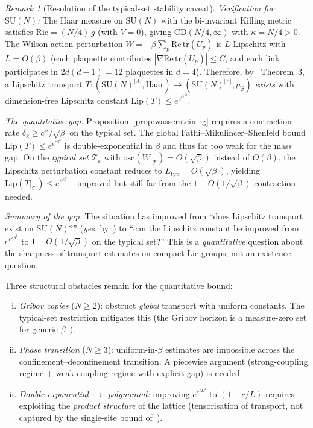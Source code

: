 \documentclass[12pt,a4paper]{article}
\theoremstyle{definition}
\theoremstyle{plain}
\theoremstyle{remark}
\newtheorem{remark}[definition]{Remark}
\begin{document}
\begin{remark}[Resolution of the typical-set stability caveat]
\emph{Verification for $\mathrm{SU}(N)$:}
The Haar measure on $\mathrm{SU}(N)$ with the bi-invariant Killing metric
satisfies $\mathrm{Ric} = (N/4)\,g$ (with $V = 0$),
giving $\mathrm{CD}(N/4, \infty)$ with $\kappa = N/4 > 0$.
The Wilson action perturbation $W = -\beta\sum_p \mathrm{Re}\,\mathrm{tr}(U_p)$
is $L$-Lipschitz with $L = O(\beta)$ (each plaquette contributes
$|\nabla \mathrm{Re}\,\mathrm{tr}(U_p)| \leq C$, and each link
participates in $2d(d-1) = 12$ plaquettes in $d=4$).
Therefore, by~\cite{FathiMikulincerShenfeld2024} Theorem~3,
a Lipschitz transport $T: (\mathrm{SU}(N)^{|\Lambda|}, \text{Haar})
\to (\mathrm{SU}(N)^{|\Lambda|}, \mu_\beta)$ \emph{exists} with
dimension-free Lipschitz constant $\mathrm{Lip}(T) \leq e^{e^{c\beta^2}}$.

\emph{The quantitative gap.}
Proposition~\ref{prop:wasserstein-rg} requires a contraction rate
$\delta_k \geq c''/\sqrt{\beta}$ on the typical set.  The global
Fathi--Mikulincer--Shenfeld bound $\mathrm{Lip}(T) \leq e^{e^{c\beta^2}}$
is double-exponential in $\beta$ and thus far too weak for the mass gap.
On the \emph{typical set} $\mathcal{T}_\varepsilon$ with
$\mathrm{osc}(W|_{\mathcal{T}}) = O(\sqrt{\beta})$ instead of $O(\beta)$,
the Lipschitz perturbation constant reduces to $L_{\mathrm{typ}} = O(\sqrt{\beta})$,
yielding $\mathrm{Lip}(T|_{\mathcal{T}}) \leq e^{e^{c\beta}}$ -- improved
but still far from the $1 - O(1/\sqrt{\beta})$ contraction needed.

\emph{Summary of the gap.}
The situation has improved from ``does Lipschitz transport exist on
$\mathrm{SU}(N)$?'' (\emph{yes}, by~\cite{FathiMikulincerShenfeld2024})
to ``can the Lipschitz constant be improved from
$e^{e^{c\beta^2}}$ to $1 - O(1/\sqrt{\beta})$ on the typical set?''
This is a \emph{quantitative} question about the sharpness of
transport estimates on compact Lie groups, not an existence question.

Three structural obstacles remain for the quantitative bound:
\begin{enumerate}[(i)]
\item \emph{Gribov copies} ($N \geq 2$):
  obstruct \emph{global} transport with uniform constants.
  The typical-set restriction mitigates this
  (the Gribov horizon is a measure-zero set for
  generic $\beta$~\cite{Zwanziger1989}).
\item \emph{Phase transition} ($N \geq 3$):
  uniform-in-$\beta$ estimates are impossible across the
  confinement--deconfinement transition.
  A piecewise argument (strong-coupling regime + weak-coupling regime
  with explicit gap) is needed.
\item \emph{Double-exponential $\to$ polynomial:}
  improving $e^{e^{c L^2}}$ to $(1 - c/L)$ requires
  exploiting the \emph{product structure} of the lattice
  (tensorisation of transport, not captured by the single-site
  bound of~\cite{FathiMikulincerShenfeld2024}).
\end{enumerate}


\end{remark}
\end{document}
